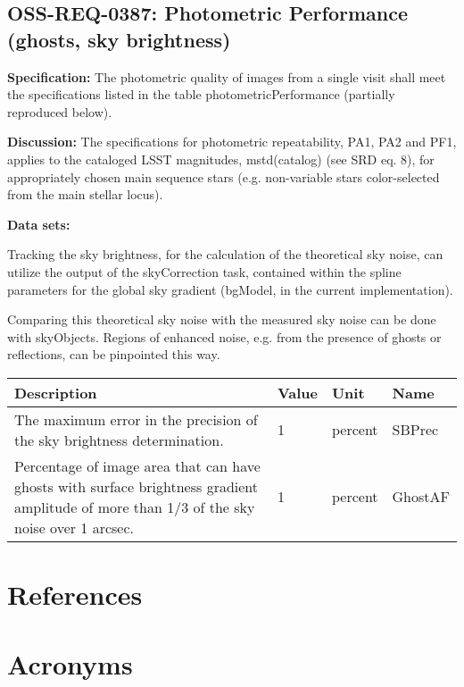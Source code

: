 \documentclass[SE,authoryear,toc]{lsstdoc}
\begin{document}
\subsection{OSS-REQ-0387: Photometric Performance (ghosts, sky brightness)}  \label{sec:photometric}

\textbf{Specification:} The photometric quality of images from a single visit shall meet the specifications listed in the table photometricPerformance (partially reproduced below).

\textbf{Discussion:} The specifications for photometric repeatability, PA1, PA2 and PF1, applies to the cataloged LSST magnitudes, mstd(catalog) (see SRD eq. 8), for appropriately chosen main sequence stars (e.g. non-variable stars color-selected from the main stellar locus).

\textbf{Data sets:} 

Tracking the sky brightness, for the calculation of the theoretical sky noise, can utilize the output of the skyCorrection task, contained within the spline parameters for the global sky gradient (bgModel, in the current implementation).

Comparing this theoretical sky noise with the measured sky noise can be done with skyObjects.  Regions of enhanced noise, e.g. from the presence of ghosts or reflections, can be pinpointed this way.

\begin{center}
\begin{tabular}{p{}p{}p{}p{}}\hline
    \textbf{Description} & \textbf{Value} & \textbf{Unit} & \textbf{Name} \\\hline
    The maximum error in the precision of the sky brightness determination. & 1 & percent & SBPrec \\\hline
    Percentage of image area that can have ghosts with surface brightness gradient amplitude of more than 1/3 of the sky noise over 1 arcsec. & 1 & percent & GhostAF \\\hline
\end{tabular}
\end{center}

\appendix
\section{References} \label{sec:bib}
\renewcommand{\refname}{} %


\section{Acronyms} \label{sec:acronyms}

\end{document}
